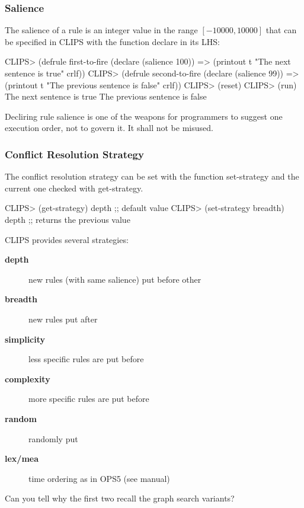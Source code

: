 \documentclass[xcolor={usenames,dvipsnames,svgnames}, compress]{beamer}
\begin{document}
\begin{frame}[fragile]
  \frametitle{Salience}
  The salience of a rule is an integer value in the range $[-10000, 10000]$ that can be specified in CLIPS with the function
  \textsf{declare} in its LHS:
  \begin{clips-code}
    CLIPS> (defrule first-to-fire
               (declare (salience 100))
               =>
               (printout t "The next sentence is true" crlf))
    CLIPS> (defrule second-to-fire
               (declare (salience 99))
               =>
               (printout t "The previous sentence is false" crlf))
    CLIPS> (reset)
    CLIPS> (run)
    The next sentence is true
    The previous sentence is false
  \end{clips-code}

  Decliring rule salience is one of the weapons for programmers to
  suggest one execution order, not to govern it. It shall not be misused.
\end{frame}

\begin{frame}[fragile]
  \frametitle{Conflict Resolution Strategy}
  The conflict resolution strategy can be set with the function
  \textsf{set-strategy} and the current one checked with \textsf{get-strategy}.
  \begin{clips-code}
    CLIPS> (get-strategy)
    depth ;; default value
    CLIPS> (set-strategy breadth)
    depth ;; returns the previous value
  \end{clips-code}
  CLIPS provides several strategies:
  \begin{description}
  \item[\textbf{depth}] new rules (with same salience) put before other
  \item[\textbf{breadth}] new rules put after
  \item[\textbf{simplicity}] less specific rules are put before
  \item[\textbf{complexity}] more specific rules are put before
  \item[\textbf{random}] randomly put
  \item[\textbf{lex/mea}] time ordering as in OPS5 (see manual)
   \end{description}
  Can you tell why the first two recall the graph search variants?
\end{frame}
\end{document}
